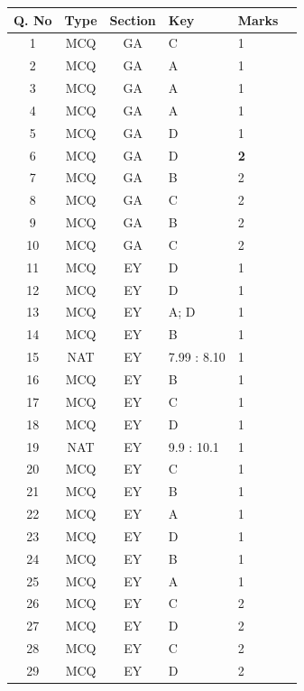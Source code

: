 \documentclass[11pt,a4paper]{article}
\begin{document}
\begin{table}[h!]
\small
\setlength{\tabcolsep}{4pt}
\renewcommand{\arraystretch}{0.9}
\centering
\begin{tabular}{|c|c|c|p{1.8cm}|p{2.5cm}|c|}
\hline
Q. No & Type & Section & Key & Marks \\
\hline
1  & MCQ & GA & C         & 1 \\
\hline
2  & MCQ & GA & A         & 1 \\
\hline
3  & MCQ & GA & A         & 1 \\
\hline
4  & MCQ & GA & A         & 1 \\
\hline
5  & MCQ & GA & D         & 1 \\
\hline
6  & MCQ & GA & D         & \textbf{2} \\
\hline
7  & MCQ & GA & B         & 2 \\
\hline
8  & MCQ & GA & C         & 2 \\
\hline
9  & MCQ & GA & B         & 2 \\
\hline
10 & MCQ & GA & C         & 2 \\
\hline
11 & MCQ & EY & D         & 1 \\
\hline
12 & MCQ & EY & D         & 1 \\
\hline
13 & MCQ & EY & A; D      & 1 \\
\hline
14 & MCQ & EY & B         & 1 \\
\hline
15 & NAT & EY & 7.99 : 8.10 & 1 \\
\hline
16 & MCQ & EY & B         & 1 \\
\hline
17 & MCQ & EY & C         & 1 \\
\hline
18 & MCQ & EY & D         & 1 \\
\hline
19 & NAT & EY & 9.9 : 10.1  & 1 \\
\hline
20 & MCQ & EY & C         & 1 \\
\hline
21 & MCQ & EY & B         & 1 \\
\hline
22 & MCQ & EY & A         & 1 \\
\hline
23 & MCQ & EY & D         & 1 \\
\hline
24 & MCQ & EY & B         & 1 \\
\hline
25 & MCQ & EY & A         & 1 \\
\hline
26 & MCQ & EY & C         & 2 \\
\hline
27 & MCQ & EY & D         & 2 \\
\hline
28 & MCQ & EY & C         & 2 \\
\hline
29 & MCQ & EY & D         & 2 \\

\end{tabular}
\end{table}
\end{document}
